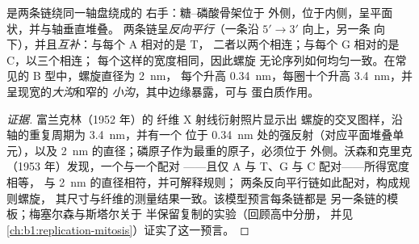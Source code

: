 \begin{theorem}[沃森–克里克双螺旋]\label{thm:b1:nucleic-acids:helix}
 是两条链绕同一轴盘绕成的
右手\emph{}：糖–磷酸骨架位于
外侧，位于内侧，呈平面状，并与轴垂直堆叠。
两条链呈\emph{反向平行}（一条沿 $5' \to 3'$ 向上，另一条
向下），并且\emph{互补}：与每个 A 相对的是 T，
二者以两个相连；与每个 G 相对的是 C，以三个相连；
每个这样的\emph{}宽度相同，因此螺旋
无论序列如何均匀一致。在常见的 B 型中，螺旋直径为 \qty{2}{nm}，
每个升高 \qty{0.34}{nm}，每圈十个升高
\qty{3.4}{nm}，并呈现宽的\emph{大沟}和窄的
\emph{小沟}，其中边缘暴露，可与
蛋白质作用。
\end{theorem}
\begin{proof}[证据]
富兰克林（1952 年）的  纤维 X 射线衍射照片显示出
螺旋的交叉图样，沿轴的重复周期为 \qty{3.4}{nm}，并有一个
位于 \qty{0.34}{nm} 处的强反射（对应平面堆叠单元），以及
\qty{2}{nm} 的直径；磷原子作为最重的原子，必须位于
外侧。沃森和克里克（1953 年）发现，一个与一个配对
——且仅 A 与 T、G 与 C 配对——所得宽度相等，
与 \qty{2}{nm} 的直径相符，并可解释规则；
两条反向平行链如此配对，构成规则螺旋，
其尺寸与纤维的测量结果一致。该模型预言每条链都是
另一条链的模板；梅塞尔森与斯塔尔关于
半保留复制的实验（回顾高中分册，
并见\cref{ch:b1:replication-mitosis}）证实了这一预言。
\end{proof}

